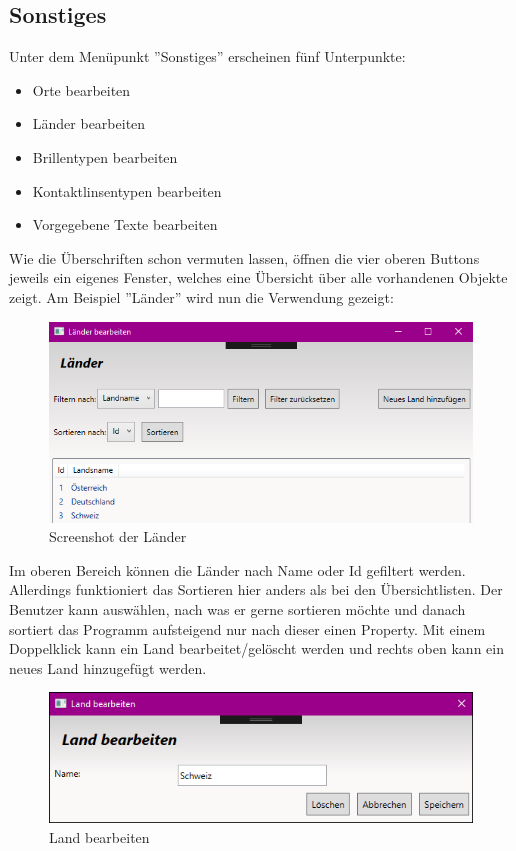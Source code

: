 \subsection{Sonstiges}
Unter dem Menüpunkt ''Sonstiges'' erscheinen fünf Unterpunkte:
\begin{itemize}
\item Orte bearbeiten
\item Länder bearbeiten
\item Brillentypen bearbeiten
\item Kontaktlinsentypen bearbeiten
\item Vorgegebene Texte bearbeiten
\end{itemize}
Wie die Überschriften schon vermuten lassen, öffnen die vier oberen Buttons jeweils ein eigenes Fenster, welches eine Übersicht über alle vorhandenen Objekte zeigt. Am Beispiel ''Länder'' wird nun die Verwendung gezeigt:
\begin{figure}[H]
\begin{center}
	\includegraphics[scale=0.75]{images/Laender.png}
\end{center}
	\caption{Screenshot der L\"ander}
	\label{fig:sample}
\end{figure} 
\noindent Im oberen Bereich können die Länder nach Name oder Id gefiltert werden. Allerdings funktioniert das Sortieren hier anders als bei den Übersichtlisten. Der Benutzer kann auswählen, nach was er gerne sortieren möchte und danach sortiert das Programm aufsteigend nur nach dieser einen Property. Mit einem Doppelklick kann ein Land bearbeitet/gelöscht werden und rechts oben kann ein neues Land hinzugefügt werden.
\begin{figure}[H]
\begin{center}
	\includegraphics[scale=0.65]{images/LandBearbeiten.png}
\end{center}
	\caption{Land bearbeiten}
	\label{fig:sample}
\end{figure} 
